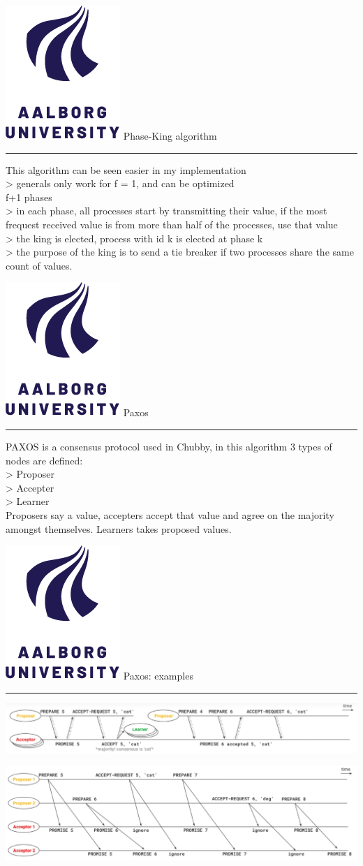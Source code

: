 \documentclass[aspectratio=1610,17pt,utf8]{beamer}
\newcommand{\regularframe}[1]{\color{black}\includegraphics[width=.05\textwidth]{figures/aau.png} #1\\\hrule}
\begin{document}
\begin{frame}{\regularframe{Phase-King algorithm}}
    This algorithm can be seen easier in my implementation\\
    > generals only work for f = 1, and can be optimized\\
    f+1 phases\\
    > in each phase, all processes start by transmitting their value, if the most frequest received value is from more than half of the processes, use that value\\
    > the king is elected, process with id k is elected at phase k\\
    > the purpose of the king is to send a tie breaker if two processes share the same count of values.
\end{frame}

\begin{frame}{\regularframe{Paxos}}
    PAXOS is a consensus protocol used in Chubby, in this algorithm 3 types of nodes are defined:\\
    > Proposer\\
    > Accepter\\
    > Learner\\
    Proposers say a value, accepters accept that value and agree on the majority amongst themselves. Learners takes proposed values.
\end{frame}

\begin{frame}{\regularframe{Paxos: examples}}
    \includegraphics[width=\textwidth]{figures/paxos1.png}
    \vspace{30pt}

    \includegraphics[width=\textwidth]{figures/paxos2.png}
\end{frame}

\end{document}
